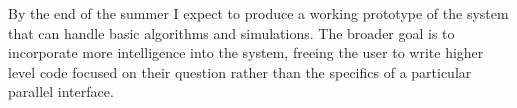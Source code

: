 \documentclass[12pt]{article}
\begin{document}
By the end of the summer I expect to produce a working prototype of the
system that can handle basic algorithms and simulations. The broader goal
is to incorporate more intelligence into the system, freeing the user to
write higher level code focused on their question rather than the specifics
of a particular parallel interface.

% 
% 

\hfill


 
\end{document}
